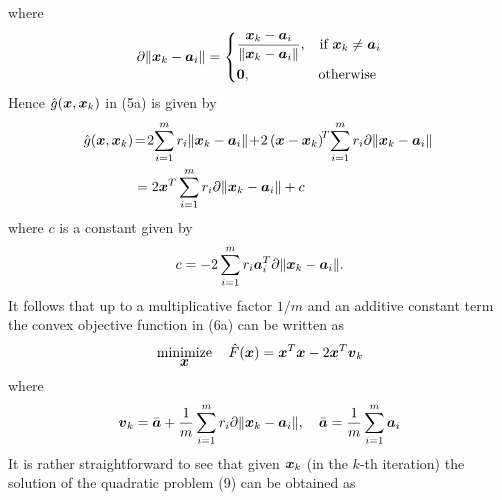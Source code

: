 where
\begin{equation}
\nonumber
\partial \|\Bx_k - \Ba_i\|  = \left\{
	\begin{aligned}
	& \frac{\Bx_k - \Ba_i}{\|\Bx_k - \Ba_i\|}, &\mbox{if } \Bx_k \neq \Ba_i \\
	& \BO, &\mbox{otherwise }%
	\end{aligned}
\right.
\end{equation}
Hence  $\hat{g}(\mbox{\boldmath$x$}, \mbox{\boldmath$x$}_k)$ in (5a) is given by
\begin{equation} %
\nonumber
\begin{aligned}
\! \hat{g}(\Bx, \Bx_k)&\! =  \! 2\! \sum^m_{i=1} r_i \|\Bx_k - \Ba_i\| \!  + \! 2 \left( \Bx - \Bx_k \right)^{\!T}\! \sum^m_{i=1} r_i \partial \|\Bx_k - \Ba_i\| \\
& = 2\Bx^T \sum^m_{i=1} r_i \partial \|\Bx_k - \Ba_i \| + c
 \end{aligned}
\end{equation}
where $c$ is a constant given by 
\begin{equation}
\nonumber
c = -2 \sum_{i = 1}^m r_i \mbox{\boldmath$a$}_i^T \partial \|\mbox{\boldmath$x$}_k - \mbox{\boldmath$a$}_i\|.
\end{equation}
It follows that up to a multiplicative factor $1/m$ and an additive constant term the convex objective function in (6a) can  be written as 
\begin{equation} %
\Min_{\Bx} \quad \hat{F}(\Bx) = \Bx^T\Bx - 2\Bx^T {\Bv}_k
\end{equation}
where
\begin{equation} %
\begin{aligned}
\Bv_k  = \bar{\Ba} + \frac{1}{m} \sum^m_{i=1} r_i \partial \|\Bx_k - \Ba_i\| , \quad \bar{\Ba} = \frac{1}{m}  \sum^m_{i = 1} \Ba_i 
\end{aligned}
\end{equation}
It is rather straightforward to see that given $\mbox{\boldmath$x$}_k$ (in the $k$-th iteration) the solution of the quadratic problem (9) can be obtained as
